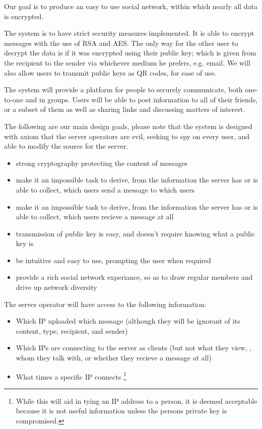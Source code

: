 Our goal is to produce an easy to use social network, within which nearly all
data is encrypted.

The system is to have strict security measures implemented. It is able to
encrypt messages with the use of RSA and AES. The only way for the other user to
decrypt the data is if it was encrypted using their public key; which is given
from the recipient to the sender via whichever medium he prefers, e.g. email.
We will also allow users to transmit public keys as QR codes, for ease of use.

The system will provide a platform for people to securely communicate, both
one-to-one and in groups. Users will be able to post information to all of their
friends, or a subset of them as well as sharing links and discussing matters of
interest.

The following are our main design goals, please note that the system is designed
with axiom that the server operators are evil, seeking to spy on every user, and
able to modify the source for the server.
\begin{itemize}
\item strong cryptography protecting the content of messages
\item make it an impossible task to derive, from the information the server has
      or is able to collect, which users send a message to which users
\item make it an impossible task to derive, from the information the server has
      or is able to collect, which users recieve a message at all
\item transmission of public key is easy, and doesn't require knowing what a
      public key is
\item be intuitive and easy to use, prompting the user when required
\item provide a rich social network experiance, so as to draw regular members
      and drive up network diversity
\end{itemize}

The server operator will have access to the following information:
\begin{itemize}
\item Which IP uploaded which message (although they will be ignorant of its
content, type, recipient, and sender)
\item Which IPs are connecting to the server as clients (but not what they view,
      , whom they talk with, or whether they recieve a message at all)
\item What times a specific IP connects \footnote {While this will aid in tying
an IP address to a person, it is deemed acceptable because it is not useful
information unless the persons private key is compromised.}
\end{itemize}

